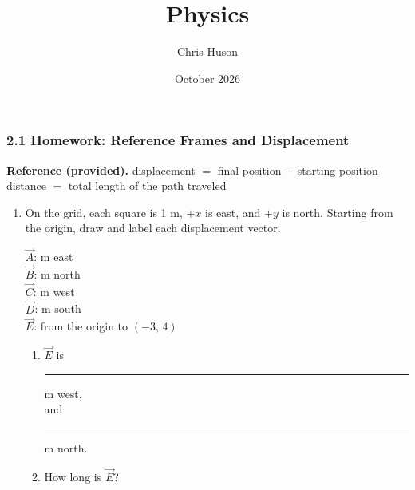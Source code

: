 \documentclass[12pt, twoside]{article}
\title{Physics}
\author{Chris Huson}
\date{October 2026}
\begin{document}
\subsubsection*{2.1 Homework: Reference Frames and Displacement}

\textbf{Reference (provided).} \quad
displacement $=$ final position $-$ starting position \\
distance $=$ total length of the path traveled

\vspace{0.2cm}

\begin{enumerate}[itemsep=0.5cm]

\item On the grid, each square is 1 m, $+x$ is east, and $+y$ is north. Starting
  from the origin, draw and label each displacement vector.

  \begin{minipage}[t]{0.42\linewidth}
    \vspace{0.2cm}
    $\vec{A}$:  m east \\[0.25cm]
    $\vec{B}$:  m north \\[0.25cm]
    $\vec{C}$:  m west \\[0.25cm]
    $\vec{D}$:  m south \\[0.25cm]
    $\vec{E}$: \; from the origin to $(-3,\, 4)$

    \vspace{0.6cm}

    \begin{enumerate}[itemsep=0.8cm]
      \item $\vec{E}$ is \rule{1cm}{0.4pt} m west, \\[0.3cm]
        and \rule{1cm}{0.4pt} m north.
      \item How long is $\vec{E}$?
    \end{enumerate}
  \end{minipage}
  \hfill
  \begin{minipage}[t]{0.54\linewidth}
    \vspace{0pt}
    \centering
  \end{minipage}


\end{enumerate}
\end{document}
